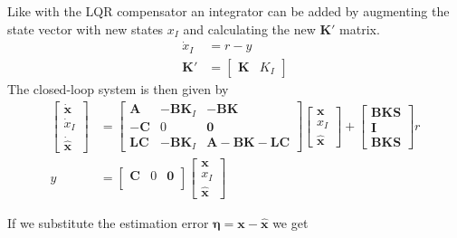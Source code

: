 Like with the LQR compensator an integrator can be added by augmenting the state vector with new states $x_I$ and calculating the new $\mathbf{K'}$ matrix.
\begin{align*}
    \dot{x}_I   & = r - y            \\
    \mathbf{K'} & = \begin{bmatrix}
                        \mathbf{K} & K_I
                    \end{bmatrix}
\end{align*}
The closed-loop system is then given by
\begin{align*}
    \begin{bmatrix}
        \dot{\mathbf{x}} \\
        \dot{x}_I        \\
        \dot{\hat{\textbf{x}}}
    \end{bmatrix}
      & =
    \begin{bmatrix}
        \mathbf{A}  & \mathbf{-BK}_I & \mathbf{-BK}     \\
        \mathbf{-C} & 0              & \mathbf{0}       \\
        \mathbf{LC} & \mathbf{-BK}_I & \mathbf{A-BK-LC}
    \end{bmatrix}
    \begin{bmatrix}
        \mathbf{x} \\
        x_I        \\
        \hat{\textbf{x}}
    \end{bmatrix}
    +
    \begin{bmatrix}
        \mathbf{BKS} \\
        \mathbf{I}   \\
        \mathbf{BKS}
    \end{bmatrix}
    r                                 \\
    y & = \begin{bmatrix}
              \mathbf{C} & 0 & \mathbf{0} \\
          \end{bmatrix}
    \begin{bmatrix}
        \mathbf{x} \\
        x_I        \\
        \hat{\textbf{x}}
    \end{bmatrix}
\end{align*}

If we substitute the estimation error $\bm{\eta}=\textbf{x}-\hat{\textbf{x}}$ we get

